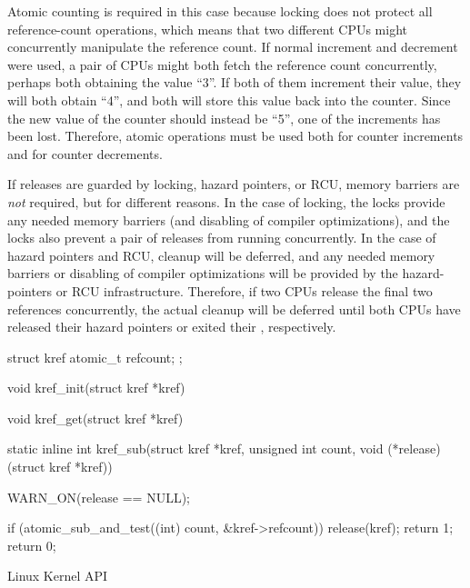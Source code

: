 Atomic counting is required in this case because locking does not protect
all reference-count operations, which means that two different CPUs
might concurrently manipulate the reference count.
If normal increment and decrement were used, a pair of CPUs might both
fetch the reference count concurrently, perhaps both obtaining
the value ``3''.
If both of them increment their value, they will both obtain ``4'',
and both will store this value back into the counter.
Since the new value of the counter should instead be ``5'', one
of the increments has been lost.
Therefore, atomic operations must be used both for counter increments
and for counter decrements.

If releases are guarded by locking, hazard pointers, or RCU,
memory barriers are \emph{not} required, but for different reasons.
In the case of locking, the locks provide any needed memory barriers
(and disabling of compiler optimizations), and the locks also
prevent a pair of releases from running concurrently.
In the case of hazard pointers and RCU, cleanup will be deferred,
and any needed memory barriers or disabling of compiler optimizations
will be provided by the hazard-pointers or RCU infrastructure.
Therefore, if two CPUs release the final two references concurrently, the
actual cleanup will be deferred until both CPUs have released their hazard
pointers or exited their , respectively.

\QuickQuizEnd

\begin{listing}
\begin{fcvlabel}
\begin{VerbatimL}[commandchars=\\\[\]]
struct kref {						\lnlbl[kref:b]
	atomic_t refcount;
};							\lnlbl[kref:e]

void kref_init(struct kref *kref)										\lnlbl[init:e]

void kref_get(struct kref *kref)										\lnlbl[get:e]

static inline int					\lnlbl[sub:b]
kref_sub(struct kref *kref, unsigned int count,
         void (*release)(struct kref *kref))
{
	WARN_ON(release == NULL);

	if (atomic_sub_and_test((int) count,		\lnlbl[check]
	                        &kref->refcount)) {
		release(kref);				\lnlbl[rel]
		return 1;				\lnlbl[ret:1]
	}
	return 0;
}							\lnlbl[sub:e]
\end{VerbatimL}
\end{fcvlabel}
\caption{Linux Kernel  API}
\label{lst:together:Linux Kernel kref API}
\end{listing}


